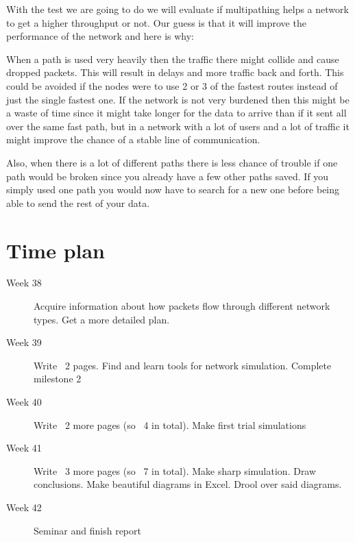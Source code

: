 \documentclass[11pt,twocolumn]{article}
\begin{document}
With the test we are going to do we will evaluate if multipathing helps a network to get a higher throughput or not. Our guess is that it will improve the performance of the network and here is why:

When a path is used very heavily then the traffic there might collide and cause dropped packets. This will result in delays and more traffic back and forth. This could be avoided if the nodes were to use 2 or 3 of the fastest routes instead of just the single fastest one. If the network is not very burdened then this might be a waste of time since it might take longer for the data to arrive than if it sent all over the same fast path, but in a network with a lot of users and a lot of traffic it might improve the chance of a stable line of communication.

Also, when there is a lot of different paths there is less chance of trouble if one path would be broken since you already have a few other paths saved. If you simply used one path you would now have to search for a new one before being able to send the rest of your data.


\section{Time plan}
\begin{description}
\item[Week 38]
Acquire information about how packets flow through different network types. Get a more detailed plan.
\item[Week 39]
Write ~2 pages. Find and learn tools for network simulation. Complete milestone 2
\item[Week 40]
Write ~2 more pages (so ~4 in total). Make first trial simulations
\item[Week 41]
Write ~3 more pages (so ~7 in total). Make sharp simulation. Draw conclusions. Make beautiful diagrams in Excel. Drool over said diagrams.
\item[Week 42]
Seminar and finish report
\end{description}
\end{document}
